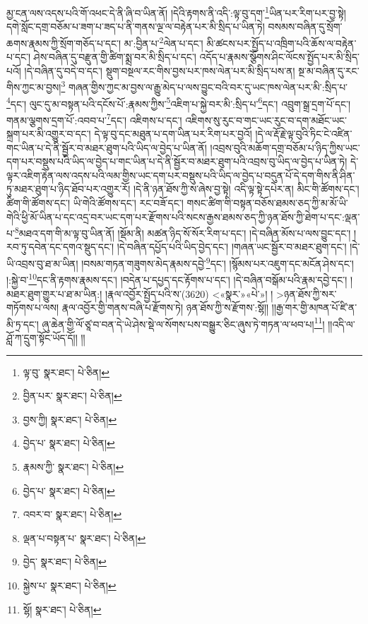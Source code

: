 མྱ་ངན་ལས་འདས་པའི་གོ་འཕང་དེ་ནི་ཞི་བ་ཡིན་ནོ། །དེའི་རྟགས་ནི་འདི་:ལྟ་བུ་དག་\footnote{ལྟ་བུ་  སྣར་ཐང་།  པེ་ཅིན། }ཡིན་པར་རིག་པར་བྱ་སྟེ། དགེ་སློང་དགྲ་བཅོམ་པ་ཟག་པ་ཟད་པ་ནི་གནས་ལྔ་ལ་བརྟེན་པར་མི་སྲིད་པ་ཡིན་ཏེ། བསམས་བཞིན་དུ་སྲོག་ཆགས་རྣམས་ཀྱི་སྲོག་གཅོད་པ་དང་། མ་:བྱིན་པ་\footnote{བྱིན་པར་  སྣར་ཐང་།  པེ་ཅིན། }ལེན་པ་དང་། མི་ཚངས་པར་སྤྱོད་པ་འཁྲིག་པའི་ཆོས་ལ་བརྟེན་པ་དང་། ཤེས་བཞིན་དུ་བརྫུན་གྱི་ཚིག་སྨྲ་བར་མི་སྲིད་པ་དང་། འདོད་པ་རྣམས་སྩོགས་ཤིང་ལོངས་སྤྱོད་པར་མི་སྲིད་པའོ། །དེ་བཞིན་དུ་བདེ་བ་དང་། སྡུག་བསྔལ་རང་གིས་བྱས་པར་ཁས་ལེན་པར་མི་སྲིད་པས་ན། སྔ་མ་བཞིན་དུ་རང་གིས་ཀྱང་མ་བྱས།\footnote{བྱས་ཀྱི།  སྣར་ཐང་།  པེ་ཅིན། } གཞན་གྱིས་ཀྱང་མ་བྱས་ལ་རྒྱུ་མེད་པ་ལས་བྱུང་བའི་བར་དུ་ཡང་ཁས་ལེན་པར་མི་:སྲིད་པ་\footnote{བྱེད་པ་  སྣར་ཐང་།  པེ་ཅིན། }དང་། ལུང་དུ་མ་བསྟན་པའི་དངོས་པོ་:རྣམས་ཀྱིས་\footnote{རྣམས་ཀྱི་  སྣར་ཐང་།  པེ་ཅིན། }འཇིག་པ་སྐྱེ་བར་མི་:སྲིད་པ་\footnote{བྱེད་པ་  སྣར་ཐང་།  པེ་ཅིན། }དང་། འབྲུག་སྒྲ་དྲག་པོ་དང་། གནམ་ལྕགས་དྲག་པོ་:འབབ་པ་\footnote{འབར་བ་  སྣར་ཐང་།  པེ་ཅིན། }དང་། འཇིགས་པ་དང་། འཇིགས་སུ་རུང་བ་གང་ཡང་རུང་བ་དག་མཐོང་ཡང་སྐྲག་པར་མི་འགྱུར་བ་དང་། དེ་ལྟ་བུ་དང་མཐུན་པ་དག་ཡིན་པར་རིག་པར་བྱའོ། །དེ་ལ་རྡོ་རྗེ་ལྟ་བུའི་ཏིང་ངེ་འཛིན་གང་ཡིན་པ་དེ་ནི་སྦྱོར་བ་མཐར་ཐུག་པའི་ཡིད་ལ་བྱེད་པ་ཡིན་ནོ། །འབྲས་བུའི་མཆོག་དགྲ་བཅོམ་པ་ཉིད་ཀྱིས་ཡང་དག་པར་བསྡུས་པའི་ཡིད་ལ་བྱེད་པ་གང་ཡིན་པ་དེ་ནི་སྦྱོར་བ་མཐར་ཐུག་པའི་འབྲས་བུ་ཡིད་ལ་བྱེད་པ་ཡིན་ཏེ། དེ་ལྟར་འཇིག་རྟེན་ལས་འདས་པའི་ལམ་གྱིས་ཡང་དག་པར་བསྡུས་པའི་ཡིད་ལ་བྱེད་པ་བདུན་པོ་དེ་དག་གིས་ནི་ཤིན་ཏུ་མཐར་ཐུག་པ་ཉིད་ཐོབ་པར་འགྱུར་རོ། །དེ་ནི་ཉན་ཐོས་ཀྱི་ས་ཞེས་བྱ་སྟེ། འདི་ལྟ་སྟེ་དཔེར་ན། མིང་གི་ཚོགས་དང་། ཚིག་གི་ཚོགས་དང་། ཡི་གེའི་ཚོགས་དང་། རང་བཟོ་དང་། གསང་ཚིག་གི་བསྟན་བཅོས་ཐམས་ཅད་ཀྱི་མ་མོ་ཡི་གེའི་ཕྱི་མོ་ཡིན་པ་དང་འདྲ་བར་ཡང་དག་པར་རྫོགས་པའི་སངས་རྒྱས་ཐམས་ཅད་ཀྱི་ཉན་ཐོས་ཀྱི་ཐེག་པ་དང་:ལྡན་པ་\footnote{ལྡན་པ་བསྟན་པ་  སྣར་ཐང་།  པེ་ཅིན། }མཐའ་དག་གི་མ་ལྟ་བུ་ཡིན་ནོ། །སྡོམ་ནི། མཚན་ཉིད་སོ་སོར་རིག་པ་དང་། །དེ་བཞིན་མོས་པ་ལས་བྱུང་དང་། །རབ་ཏུ་དབེན་དང་དགའ་སྡུད་དང་། །དེ་བཞིན་དཔྱོད་པའི་ཡིད་བྱེད་དང་། །གཞན་ཡང་སྦྱོར་བ་མཐར་ཐུག་དང་། །དེ་ཡི་འབྲས་བུ་ཐ་མ་ཡིན། །བསམ་གཏན་གཟུགས་མེད་རྣམས་དབྱེ་\footnote{བྱེད་  སྣར་ཐང་།  པེ་ཅིན། }དང་། །སྙོམས་པར་འཇུག་དང་མངོན་ཤེས་དང་། །:སྐྱེ་བ་\footnote{སྐྱེས་པ་  སྣར་ཐང་།  པེ་ཅིན། }དང་ནི་རྟགས་རྣམས་དང་། །བདེན་པ་དཔྱད་དང་རྟོགས་པ་དང་། །དེ་བཞིན་བསྒོམ་པའི་རྣམ་དབྱེ་དང་། །མཐར་ཐུག་གྱུར་པ་ཐ་མ་ཡིན:། །རྣལ་འབྱོར་སྤྱོད་པའི་ས་(3620) <«སྣར་»«པེ་»། །
>ཉན་ཐོས་ཀྱི་སར་གཏོགས་པ་ལས། རྣལ་འབྱོར་གྱི་གནས་བཞི་པ་རྫོགས་ཏེ། ཉན་ཐོས་ཀྱི་ས་རྫོགས་:སྷོ།། །།རྒྱ་གར་གྱི་མཁན་པོ་ཛི་ན་མི་ཏྲ་དང་། ཞུ་ཆེན་གྱི་ལོ་ཙཱ་བ་བན་དེ་ཡེ་ཤེས་སྡེ་ལ་སོགས་པས་བསྒྱུར་ཅིང་ཞུས་ཏེ་གཏན་ལ་ཕབ་པ།\footnote{སྷོ།  སྣར་ཐང་།  པེ་ཅིན། }། །།འདི་ལ་ཤློ་ཀ་དྲུག་སྟོང་ཡོད་དོ།། །།